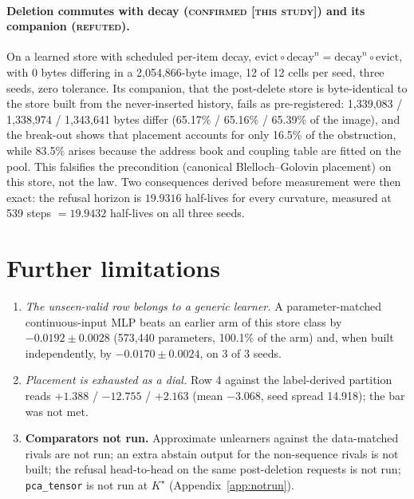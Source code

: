 \documentclass{article} %
\newcommand{\Kstar}{\ensuremath{K^{\star}}}
\begin{document}
\paragraph{Deletion commutes with decay (\textsc{confirmed [this study]}) and its companion
(\textsc{refuted}).} On a learned store with scheduled per-item decay,
$\text{evict}\circ\text{decay}^n=\text{decay}^n\circ\text{evict}$, with 0 bytes differing in a
2,054,866-byte image, 12 of 12 cells per seed, three seeds, zero tolerance.
Its companion, that the post-delete store is byte-identical to the store built from the
never-inserted history, fails as pre-registered: 1,339,083 / 1,338,974 / 1,343,641 bytes differ
(65.17\% / 65.16\% / 65.39\% of the image), and the break-out shows that placement accounts for
only 16.5\% of the obstruction, while 83.5\% arises because the address book and coupling table
are fitted on the pool. %
This falsifies the precondition (canonical Blelloch--Golovin placement) on this store, not the
law. Two consequences derived before measurement were then exact: the refusal horizon is $19.9316$
half-lives for every curvature, measured at 539 steps $=19.9432$ half-lives on all three seeds.


\section{Further limitations}
\label{app:morelimits}
\begin{enumerate}[leftmargin=*,itemsep=1pt]
\item \emph{The unseen-valid row belongs to a generic learner.} A parameter-matched
  continuous-input MLP beats an earlier arm of this store class by $-0.0192\pm0.0028$ (573,440
  parameters, 100.1\% of the arm) and, when built independently, by $-0.0170\pm0.0024$, on 3 of 3
  seeds. %
\item \emph{Placement is exhausted as a dial.} Row 4 against the label-derived partition reads
  $+1.388$ / $-12.755$ / $+2.163$ (mean $-3.068$, seed spread 14.918); the bar was not met.
\item \textbf{Comparators not run.} Approximate unlearners against the data-matched rivals are not
  run; an extra abstain output for the non-sequence rivals is not built; the refusal head-to-head on
  the same post-deletion requests is not run; \texttt{pca\_tensor} is not run at $\Kstar$
  (Appendix~\ref{app:notrun}).
\end{enumerate}
\end{document}
